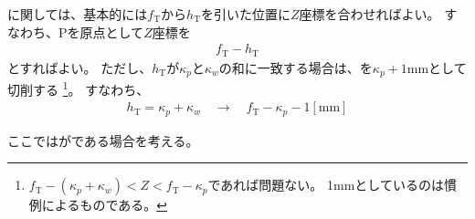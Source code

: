 \clearpage
\modHeadsection{\TopOutcutLength}
\TopOutcutLength に関しては、基本的には\AlocationLength$f_\mathrm T$から\TopOutcutLength$h_\mathrm T$を引いた位置に$Z$座標を合わせればよい。
すなわち、\TableCenter Pを原点として$Z$座標を
\begin{align*}
  f_\mathrm T - h_\mathrm T
\end{align*}
とすればよい。
ただし、\TopOutcutLength$h_\mathrm T$が\KeywayPos$\kappa_p$と\KeywayWidth$\kappa_w$の和に一致する場合は、\TopOutcutLength を$\kappa_p+1$mmとして切削する
\footnote{$f_\mathrm T-(\kappa_p+\kappa_w) < Z < f_\mathrm T-\kappa_p$であれば問題ない。
1mmとしているのは慣例によるものである。}。
すなわち、
\begin{align*}
  h_\mathrm T = \kappa_p+\kappa_w \quad \longrightarrow \quad f_\mathrm T-\kappa_p-1[\mathrm{mm}]
\end{align*}



\clearpage
ここでは\Outcut が\CurvedOutcut である場合を考える。


